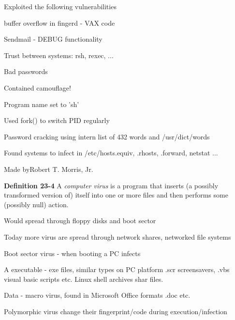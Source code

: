 \documentclass[Screen16to9,17pt]{foils}
\begin{document}

\begin{list1}
\item Exploited the following vulnerabilities
\begin{list2}
\item buffer overflow in fingerd - VAX code
\item Sendmail - DEBUG functionality
\item Trust between systems: rsh, rexec, ...
\item Bad passwords
\end{list2}
\item Contained camouflage!
\begin{list2}
\item Program name set to 'sh'
\item Used fork() to switch PID regularly
\item Password cracking using intern list of 432 words and /usr/dict/words
\item Found systems to infect in /etc/hosts.equiv, .rhosts, .forward, netstat ...
\end{list2}
\item Made byRobert T. Morris, Jr.
\end{list1}




\begin{list1}
\item {\bf Definition 23-4} A \emph{computer virus} is a program that inserts (a possibly transformed version of) itself into one or more files and then performs some (possibly null) action.
\item Would spread through floppy disks and boot sector
\item Today more virus are spread through network shares, networked file systems
\begin{list2}
\item Boot sector virus - when booting a PC infects
\item A executable - exe files, similar types on PC platform .scr screensavers, .vbs visual basic scripts etc. Linux shell archives shar files.
\item Data - macro virus, found in Microsoft Office formats .doc etc.
\end{list2}
\item Polymorphic virus change their fingerprint/code during execution/infection
\end{list1}
\end{document}

